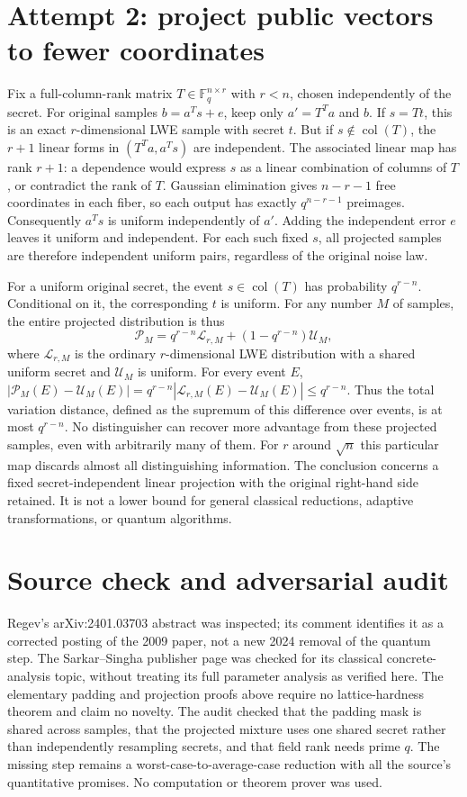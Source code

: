 \documentclass[11pt]{article}
\begin{document}
\section{Attempt 2: project public vectors to fewer coordinates}
Fix a full-column-rank matrix $T\in\mathbb F_q^{n\times r}$ with $r<n$,
chosen independently of the secret. For original samples
$b=a^Ts+e$, keep only $a'=T^Ta$ and $b$.
If $s=Tt$, this is an exact $r$-dimensional LWE sample with secret $t$.
But if $s\notin\operatorname{col}(T)$, the $r+1$ linear forms in
$(T^Ta,a^Ts)$ are independent. The associated linear map has rank $r+1$:
a dependence would express $s$ as a linear combination of columns of $T$,
or contradict the rank of $T$. Gaussian elimination gives $n-r-1$ free
coordinates in each fiber, so each output has exactly $q^{n-r-1}$ preimages.
Consequently $a^Ts$ is uniform independently of $a'$.
Adding the independent error $e$ leaves it uniform and independent.
For each such fixed $s$, all projected samples are therefore independent
uniform pairs, regardless of the original noise law.

For a uniform original secret, the event $s\in\operatorname{col}(T)$ has
probability $q^{r-n}$. Conditional on it, the corresponding $t$ is uniform.
For any number $M$ of samples, the entire projected distribution is thus
\[
\mathcal P_M=q^{r-n}\mathcal L_{r,M}
 +(1-q^{r-n})\mathcal U_M,
\]
where $\mathcal L_{r,M}$ is the ordinary $r$-dimensional LWE distribution
with a shared uniform secret and $\mathcal U_M$ is uniform.
For every event $E$,
$|\mathcal P_M(E)-\mathcal U_M(E)|
=q^{r-n}|\mathcal L_{r,M}(E)-\mathcal U_M(E)|\le q^{r-n}$.
Thus the total variation distance, defined as the supremum of this difference
over events, is at most $q^{r-n}$. No distinguisher can recover more advantage
from these projected samples, even with arbitrarily many of them.
For $r$ around $\sqrt n$ this particular map discards almost all distinguishing
information. The conclusion concerns a fixed secret-independent linear
projection with the original right-hand side retained. It is not a lower
bound for general classical reductions, adaptive transformations, or quantum
algorithms.

\section{Source check and adversarial audit}
Regev's arXiv:2401.03703 abstract was inspected; its comment identifies it as
a corrected posting of the 2009 paper, not a new 2024 removal of the quantum
step. The Sarkar--Singha publisher page was checked for its classical
concrete-analysis topic, without treating its full parameter analysis as
verified here. The elementary padding and projection proofs above require
no lattice-hardness theorem and claim no novelty.
The audit checked that the padding mask is shared across samples, that the
projected mixture uses one shared secret rather than independently resampling
secrets, and that field rank needs prime $q$. The missing step remains a
worst-case-to-average-case reduction with all the source's quantitative
promises. No computation or theorem prover was used.
\end{document}
